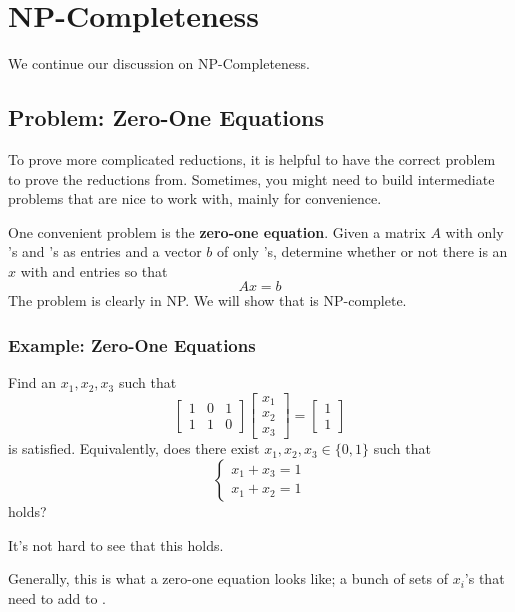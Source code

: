\documentclass[letterpaper]{article}
\begin{document}
\section{NP-Completeness}
We continue our discussion on NP-Completeness. 

\subsection{Problem: Zero-One Equations}
To prove more complicated reductions, it is helpful to have the correct problem to prove the reductions from. Sometimes, you might need to build intermediate problems that are nice to work with, mainly for convenience. 

\bigskip 

One convenient problem is the \textbf{zero-one equation}. Given a matrix $A$ with only 's and 's as entries and a vector $b$ of only 's, determine whether or not there is an $x$ with  and  entries so that 
\[Ax = b\]
The problem is clearly in NP. We will show that is NP-complete. 

\subsubsection{Example: Zero-One Equations}
Find an $x_1, x_2, x_3$ such that 
\[\begin{bmatrix}
    1 & 0 & 1 \\ 1 & 1 & 0
\end{bmatrix} \begin{bmatrix}
    x_1 \\ x_2 \\ x_3
\end{bmatrix} = \begin{bmatrix}
    1 \\ 1
\end{bmatrix}\]
is satisfied. Equivalently, does there exist $x_1, x_2, x_3 \in \{0, 1\}$ such that 
\[\begin{cases}
    x_1 + x_3 = 1 \\ 
    x_1 + x_2 = 1
\end{cases}\]
holds? 

\begin{mdframed}[]
    It's not hard to see that this holds.     
\end{mdframed}

Generally, this is what a zero-one equation looks like; a bunch of sets of $x_i$'s that need to add to . 
\end{document}
